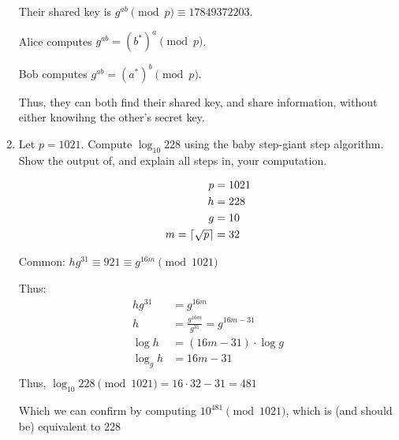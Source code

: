 \begin{problem}
\begin{enumerate}
\begin{Answer}
      \noindent
      Their shared key is $g^{ab} \pmod{p} \equiv 17849372203$.

      \noindent
      Alice computes $g^{ab} = {(b^*)}^{a} \pmod{p}$.

      \noindent
      Bob computes $g^{ab} = {(a^*)}^{b} \pmod{p}$.

      \noindent
      Thus, they can both find their shared key, and share information,
      without either knowihng the other's secret key.
    \end{Answer}
    
    \item Let $p = 1021$.  Compute $\log_{10} 228$ using the baby step-giant
    step algorithm. Show the output of, and explain all steps in, your computation.
    \begin{Answer}
      \begin{multicols*}{2}
        \begin{align*}
          p &= 1021 \\
          h &= 228 \\
          g &= 10 \\
          m = \lceil{} \sqrt{p} \rceil &= 32 \\
        \end{align*}
        \noindent

        \noindent
        
        \noindent
        Common: $hg^{31} \equiv 921 \equiv g^{16m} \pmod{1021}$

        \noindent
        Thus:
        \begin{align*}
          hg^{31} &= g^{16m} \\
          h &= \frac{g^{16m}}{g^{31}} = g^{16m - 31} \\
          \log h &= (16m - 31) \cdot \log g \\
          \log_{g}{h} &= 16m - 31 \\
        \end{align*}
        Thus, $\log_{10} 228 \pmod {1021} = 16 \cdot{32} - 31 = 481$

        \noindent
        Which we can confirm by computing $10^{481} \pmod{1021}$, which is (and should be) equivalent to $228$
      \end{multicols*}
    \end{Answer}
    

\end{enumerate}
\end{problem}
